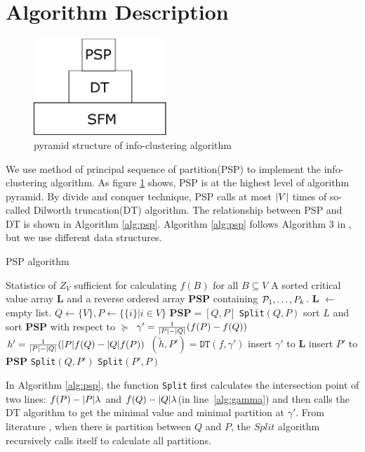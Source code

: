 \documentclass{article}
\begin{document}
\section{Algorithm Description}
\begin{figure}[!ht]
\centering
\includegraphics[width=5cm]{pic/pyramid.eps}
\caption{pyramid structure of info-clustering algorithm}\label{fig:ps}
\end{figure}
We use method of principal sequence of partition(PSP) to implement the info-clustering algorithm. As figure \ref{fig:ps} shows, PSP is at the highest level of algorithm pyramid. By divide and conquer technique, PSP calls at most $\abs{V}$ times of so-called Dilworth truncation(DT) algorithm. The relationship between PSP and DT is shown in Algorithm \ref{alg:psp}. Algorithm \ref{alg:psp} follows Algorithm 3 in \cite{ic}, but we use different data structures.
\begin{algorithm}
\caption{PSP algorithm}\label{alg:psp}
\begin{algorithmic}[1]
\REQUIRE Statistics of $Z_V$ sufficient for calculating $f(B)$ for all $B \subseteq V$
\ENSURE A sorted critical value array \textbf{L} and a reverse ordered array \textbf{PSP} containing $\P_1,\dots, P_k$.
\STATE \textbf{L}  $\leftarrow$ empty list.
\STATE $Q\leftarrow \{V\}, P \leftarrow \{ \{i \} | i \in V\}$
\STATE $\mathbf{PSP}= [Q, P]$
\STATE \texttt{Split}$(Q,P)$
\STATE sort $L$ and sort $\mathbf{PSP}$ with respect to $\succeq$ 
 \STATE\label{alg:gamma} $\gamma' = {1 \over \abs{P} - \abs{Q}} (f(P)-f(Q))$
 \STATE $h' = {1 \over \abs{P} - \abs{Q}}(\abs{P} f(Q) - \abs{Q} f(P))$
 \STATE $(\tilde{h}, P') = \texttt{DT}(f,\gamma')$ \footnotemark
 	\STATE insert $\gamma'$ to $\mathbf{L}$
 \ELSE
 	\STATE insert $P'$ to $\mathbf{PSP}$
 	\STATE \texttt{Split}$(Q, P')$
 	\STATE \texttt{Split}$(P',P)$
 \ENDIF
\ENDFUNCTION
\end{algorithmic}
\end{algorithm}
In Algorithm \ref{alg:psp}, the function \texttt{Split} first calculates the intersection point of two lines: $f(P)-\abs{P}\lambda$ and $f(Q)-\abs{Q}\lambda$(in line~\ref{alg:gamma}) and then calls the DT algorithm to get the minimal value and minimal partition at $\gamma'$. From literature \cite{mac}, when there is partition between $Q$ and $P$, the $Split$ algorithm recursively calls itself to calculate all partitions.
\end{document}
